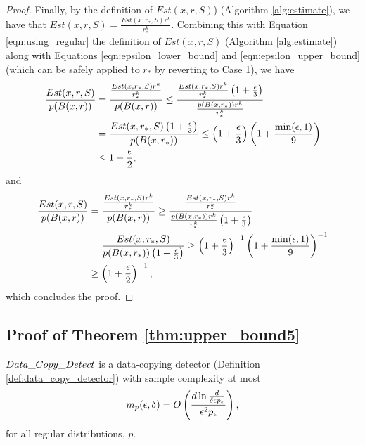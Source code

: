 \begin{proof}
Finally, by the definition of $Est(x, r, S)$) (Algorithm \ref{alg:estimate}), we have that $Est(x, r, S) = \frac{Est(x, r_*, S)r^k}{r_*^k}$. Combining this with Equation \ref{eqn:using_regular} the definition of $Est(x,r, S)$ (Algorithm \ref{alg:estimate}) along with Equations \ref{eqn:epsilon_lower_bound} and \ref{eqn:epsilon_upper_bound} (which can be safely applied to $r_*$ by reverting to Case 1), we have
\begin{equation*}
\begin{split}
\frac{Est(x, r, S)}{p(B(x, r))} &= \frac{\frac{Est(x, r_*, S)r^k}{r_*^k}}{p(B(x, r))} \leq \frac{\frac{Est(x, r_*, S)r^k}{r_*^k}\left(1 + \frac{\epsilon}{3}\right)}{\frac{p(B(x, r_*))r^k}{r_*^k}} \\
&= \frac{Est(x, r_*, S)\left(1 + \frac{\epsilon}{3}\right)}{p(B(x, r_*))} \leq \left(1 + \frac{\epsilon}{3}\right)\left(1 + \frac{\min(\epsilon, 1)}{9}\right) \\
&\leq 1 + \frac{\epsilon}{2},
\end{split}
\end{equation*}
and
\begin{equation*}
\begin{split}
\frac{Est(x, r, S)}{p(B(x, r))} &= \frac{\frac{Est(x, r_*, S)r^k}{r_*^k}}{p(B(x, r))} \geq \frac{\frac{Est(x, r_*, S)r^k}{r_*^k}}{\frac{p(B(x, r_*))r^k}{r_*^k}\left(1 + \frac{\epsilon}{3}\right)} \\
&= \frac{Est(x, r_*, S)}{p(B(x, r_*))\left(1 + \frac{\epsilon}{3}\right)} \geq \left(1 + \frac{\epsilon}{3}\right)^{-1}\left(1 + \frac{\min(\epsilon, 1)}{9}\right)^{-1} \\
&\geq \left(1 + \frac{\epsilon}{2}\right)^{-1},
\end{split}
\end{equation*}
which concludes the proof.


\end{proof}

\subsection{Proof of Theorem \ref{thm:upper_bound5}}\label{sec:upper_bound_proof}

\begin{theorem}
$Data\_Copy\_Detect{}$ is a data-copying detector (Definition \ref{def:data_copy_detector}) with sample complexity at most $$m_p(\epsilon, \delta) = O\left(\frac{d\ln\frac{d}{\delta\epsilon p_\epsilon}}{\epsilon^2 p_\epsilon}\right),$$ for all regular distributions, $p$. 
\end{theorem}

